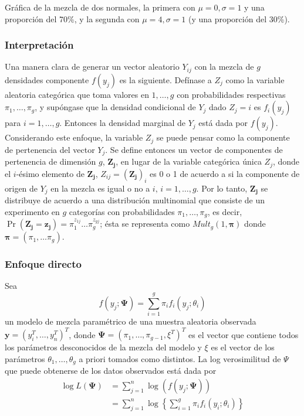 \documentclass[
]{article}
\begin{document}
Gráfica de la mezcla de dos normales, la primera con \(\mu=0,\sigma=1\)
y una proporción del 70\%, y la segunda con \(\mu=4,\sigma=1\) (y una
proporción del 30\%).

\subsubsection{Interpretación}

Una manera clara de generar un vector aleatorio \(Y_{ij}\) con la mezcla
de \(g\) densidades componente \(f(y_j)\) es la siguiente. Defínase a
\(Z_j\) como la variable aleatoria categórica que toma valores en
\(1,\ldots,g\) con probabilidades respectivas \(\pi_1,\ldots,\pi_g\), y
supóngase que la densidad condicional de \(Y_j\) dado \(Z_j=i\) es
\(f_i(y_j)\) para \(i=1,\ldots,g\). Entonces la densidad marginal de
\(Y_j\) está dada por \(f(y_j)\). Considerando este enfoque, la variable
\(Z_j\) se puede pensar como la componente de pertenencia del vector
\(Y_j\). Se define entonces un vector de componentes de pertenencia de
dimensión \(g\), \(\bm{Z_j}\), en lugar de la variable categórica única
\(Z_j\), donde el \(i\)-ésimo elemento de \(\bm{Z_j}\),
\(Z_{ij}=(\bm{Z_j})_i\) es 0 o 1 de acuerdo a si la componente de origen
de \(Y_j\) en la mezcla es igual o no a \(i, \, i=1,\ldots,g\). Por lo
tanto, \(\bm{Z_j}\) se distribuye de acuerdo a una distribución
multinomial que consiste de un experimento en \(g\) categorías con
probabilidades \(\pi_1,\ldots,\pi_g\), es decir,
\(\Pr(\bm{Z_j}=\bm{z_j})=\pi_1^{z_{1j}}\ldots \pi_g^{z_{gj}}\); ésta se
representa como \(Mult_g(1,\bm{\pi})\) donde
\(\bm{\pi}=(\pi_1,\ldots \pi_g)\).

\subsubsection{Enfoque directo}

Sea \begin{equation}
f(y_j;\bm{\Psi})=\sum_{i=1}^{g} \pi_i f_i(y_j;\theta_i)
\end{equation} un modelo de mezcla paramétrico de una muestra aleatoria
observada \(\bm{y}=(y_i^T,\ldots,y_{n}^T)^T\), donde
\(\bm{\Psi}=(\pi_1,\ldots,\pi_{g-1},\xi^T)^T\) es el vector que contiene
todos los parámetros desconocidos de la mezcla del modelo y \(\xi\) es
el vector de los parámetros \(\theta_1,\ldots,\theta_g\) a priori
tomados como distintos. La log verosimilitud de \(\Psi\) que puede
obtenerse de los datos observados está dada por \begin{align}
\log L(\bm{\Psi})&=\sum_{j=1}^n \log(f(y_j;\bm{\Psi}))\\
&=\sum_{j=1}^n \log \left \{ \sum_{i=1}^g \pi_i f_i(y_i;\theta_i) \right \}
\end{align}
\end{document}
